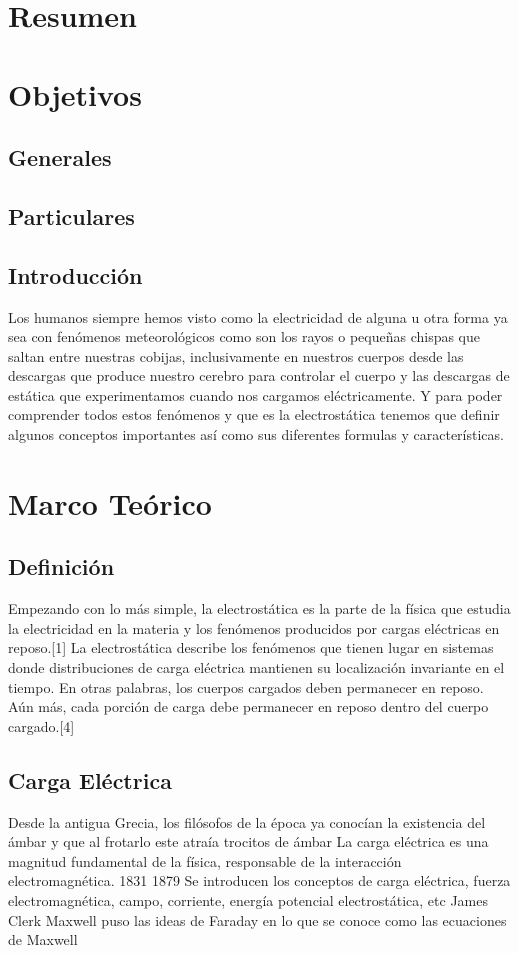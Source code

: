 \documentclass[14pt]{article}
\begin{document}
	\newpage
	\section{Resumen}
	\section{Objetivos} 
	\subsection{Generales}
	\subsection{Particulares}
	\subsection{Introducción}
	Los humanos siempre hemos visto como la electricidad de alguna u otra forma ya sea con fenómenos meteorológicos como son los rayos o pequeñas chispas que saltan entre nuestras cobijas, inclusivamente en nuestros cuerpos desde las descargas que produce nuestro cerebro para controlar el cuerpo y las descargas de estática que experimentamos cuando nos cargamos eléctricamente. Y para poder comprender todos estos fenómenos y que es la electrostática tenemos que definir algunos conceptos importantes así como sus diferentes formulas y características. 
	\section {Marco Teórico}
	  	
	\subsection{Definición}
	Empezando con lo más simple, la electrostática es la parte de la física que estudia la electricidad en la materia y los
	fenómenos producidos por cargas eléctricas en reposo.[1]
	La electrostática describe los fenómenos que tienen lugar en sistemas donde distribuciones de carga eléctrica mantienen su localización invariante en el tiempo. En
	otras palabras, los cuerpos cargados deben permanecer en reposo. Aún más, cada porción de carga debe permanecer en reposo dentro del cuerpo cargado.[4]
	\subsection{Carga Eléctrica}
	Desde la antigua Grecia, los filósofos de la época ya conocían la existencia del ámbar y que al frotarlo este atraía trocitos de ámbar
	La carga eléctrica es una magnitud fundamental de la física, responsable de la interacción electromagnética.
	1831
	1879 Se introducen los conceptos de carga eléctrica, fuerza
	electromagnética, campo, corriente, energía potencial electrostática, etc
	James Clerk Maxwell puso las ideas de Faraday en lo que se conoce como
	las ecuaciones de Maxwell
	
\end{document}
